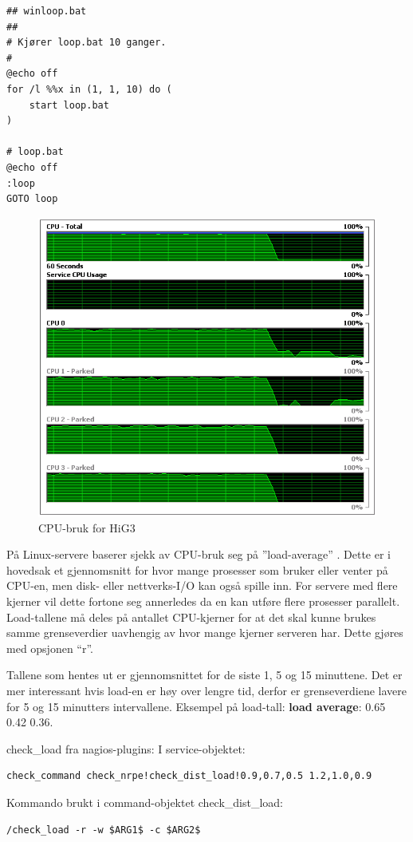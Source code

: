 \begin{lstlisting}[style=example]
## winloop.bat
##
# Kjører loop.bat 10 ganger.
#
@echo off
for /l %%x in (1, 1, 10) do (
    start loop.bat
)

# loop.bat
@echo off
:loop
GOTO loop
\end{lstlisting}

\begin{figure}[H]
    \centering
    \includegraphics[scale=0.6]{img/HiG3_cpu_graph}
    \caption{CPU-bruk for HiG3}
    \label{cpustrain}
\end{figure}

På Linux-servere baserer sjekk av CPU-bruk seg på ''load-average'' \cite{loadavg} \cite{wiki:loadavg}. Dette er i hovedsak et gjennomsnitt for hvor mange prosesser som bruker eller venter på CPU-en, men disk- eller nettverks-I/O kan også spille inn. For servere med flere kjerner vil dette fortone seg annerledes da en kan utføre flere prosesser parallelt. Load-tallene må deles på antallet CPU-kjerner for at det skal kunne brukes samme grenseverdier uavhengig av hvor mange kjerner serveren har. Dette gjøres med opsjonen ``r''.

Tallene som hentes ut er gjennomsnittet for de siste 1, 5 og 15 minuttene. Det er mer interessant hvis load-en er høy over lengre tid, derfor er grenseverdiene lavere for 5 og 15 minutters intervallene. Eksempel på load-tall: {\bf load average}: 0.65 0.42 0.36.

check\_load fra nagios-plugins:
I service-objektet:
\begin{lstlisting}[style=example]
check_command check_nrpe!check_dist_load!0.9,0.7,0.5 1.2,1.0,0.9
\end{lstlisting}
Kommando brukt i command-objektet check\_dist\_load:
\begin{lstlisting}[style=example]
/check_load -r -w $ARG1$ -c $ARG2$
\end{lstlisting}

